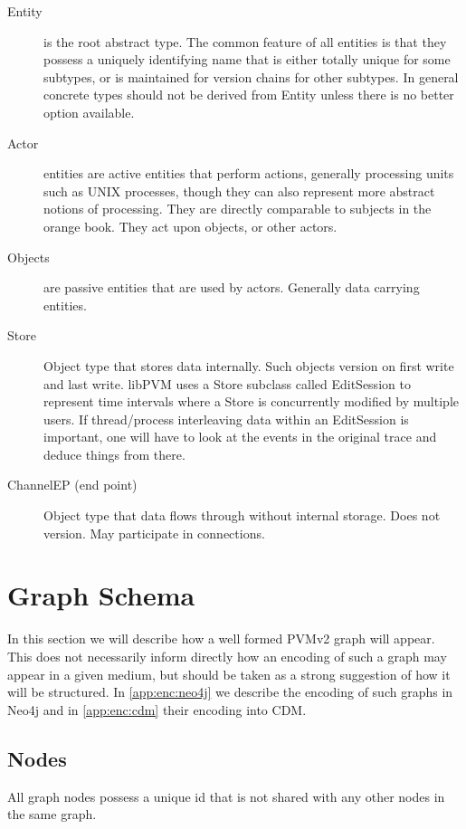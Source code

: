\documentclass[12pt,twoside,a4paper]{article}
\begin{document}
\begin{description}
\item[Entity]
\label{sec:ty:entity}
 is the root abstract type. The common feature of all entities is that they possess a uniquely identifying name that is either totally unique for some subtypes, or is maintained for version chains for other subtypes. 
 In general concrete types should not be derived from Entity unless there is no better option available.

\item[Actor]
\label{sec:ty:actor}
 entities are active entities that perform actions, generally processing units such as UNIX processes, though they can also represent more abstract notions of processing. 
 They are directly comparable to subjects in the orange book. They act upon objects, or other actors.

\item[Objects]
\label{sec:ty:object}
are passive entities that are used by actors. Generally data carrying entities.

\item[Store]
\label{sec:ty:store}
Object type that stores data internally. 
Such objects version on first write and last write. libPVM uses a Store subclass called EditSession to represent time intervals where a Store is concurrently modified by multiple users. If thread/process interleaving data within an EditSession is important, one will have to look at the  events in the original trace and deduce things from there.

\item[ChannelEP (end point)]
\label{sec:ty:chanep}
Object type that data flows through without internal storage. Does not version. May participate in connections.
\end{description}

\section{Graph Schema}
\label{sec:gs}
In this section we will describe how a well formed PVMv2 graph will appear. This does not necessarily inform directly how an encoding of such a graph may appear in a given medium, but should be taken as a strong suggestion of how it will be structured. 
In \autoref{app:enc:neo4j} we describe the encoding of such graphs in Neo4j and in \autoref{app:enc:cdm} their encoding into CDM.

\subsection{Nodes}
\label{sec:gs:node}
All graph nodes possess a unique id that is not shared with any other nodes in the same graph.
\end{document}
